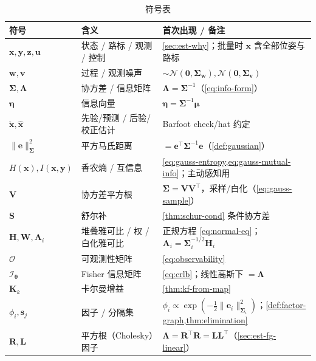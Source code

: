 \begin{table}[ht]\centering\small
\caption{符号表}
\begin{tabular}{lll}
\toprule
符号 & 含义 & 首次出现 / 备注 \\
\midrule
$\mathbf{x},\mathbf{y},\mathbf{z},\mathbf{u}$ & 状态 / 路标 / 观测 / 控制 & \cref{sec:est-why}；批量时 $\mathbf{x}$ 含全部位姿与路标 \\
$\mathbf{w},\mathbf{v}$ & 过程 / 观测噪声 & $\sim\mathcal{N}(\mathbf{0},\boldsymbol{\Sigma}_{\mathbf{w}}),\mathcal{N}(\mathbf{0},\boldsymbol{\Sigma}_{\mathbf{v}})$ \\
$\boldsymbol{\Sigma},\boldsymbol{\Lambda}$ & 协方差 / 信息矩阵 & $\boldsymbol{\Lambda}=\boldsymbol{\Sigma}^{-1}$（\cref{eq:info-form}） \\
$\boldsymbol{\eta}$ & 信息向量 & $\boldsymbol{\eta}=\boldsymbol{\Sigma}^{-1}\boldsymbol{\mu}$ \\
$\check{\mathbf{x}},\hat{\mathbf{x}}$ & 先验/预测 / 后验/校正估计 & Barfoot check/hat 约定 \\
$\|\mathbf{e}\|_{\boldsymbol{\Sigma}}^2$ & 平方马氏距离 & $=\mathbf{e}^\top\boldsymbol{\Sigma}^{-1}\mathbf{e}$（\cref{def:gaussian}） \\
$H(\mathbf{x}),I(\mathbf{x},\mathbf{y})$ & 香农熵 / 互信息 & \cref{eq:gauss-entropy,eq:gauss-mutual-info}；主动感知用 \\
$\mathbf{V}$ & 协方差平方根 & $\boldsymbol{\Sigma}=\mathbf{V}\mathbf{V}^\top$，采样/白化（\cref{eq:gauss-sample}） \\
$\mathbf{S}$ & 舒尔补 & \cref{thm:schur-cond} 条件协方差 \\
$\mathbf{H},\mathbf{W},\mathbf{A}_i$ & 堆叠雅可比 / 权 / 白化雅可比 & 正规方程 \cref{eq:normal-eq}；$\mathbf{A}_i=\boldsymbol{\Sigma}_i^{-1/2}\mathbf{H}_i$ \\
$\mathcal{O}$ & 可观测性矩阵 & \cref{eq:observability} \\
$\boldsymbol{\mathcal{I}}_{\boldsymbol{\theta}}$ & Fisher 信息矩阵 & \cref{eq:crlb}；线性高斯下 $=\boldsymbol{\Lambda}$ \\
$\mathbf{K}_k$ & 卡尔曼增益 & \cref{thm:kf-from-map} \\
$\phi_i,\mathbf{s}_j$ & 因子 / 分隔集 & $\phi_i\propto\exp(-\tfrac12\|\mathbf{e}_i\|_{\boldsymbol{\Sigma}_i}^2)$；\cref{def:factor-graph,thm:elimination} \\
$\mathbf{R},\mathbf{L}$ & 平方根（Cholesky）因子 & $\boldsymbol{\Lambda}=\mathbf{R}^\top\mathbf{R}=\mathbf{L}\mathbf{L}^\top$（\cref{sec:est-fg-linear}） \\
\bottomrule
\end{tabular}
\end{table}

